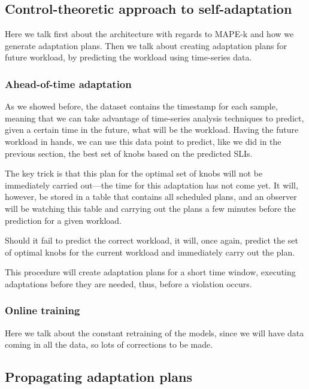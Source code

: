 \subsection{Control-theoretic approach to self-adaptation}

Here we talk first about the architecture with regards to MAPE-k and how we generate adaptation plans. Then we talk about creating adaptation plans for future workload, by predicting the workload using time-series data.

\subsubsection{Ahead-of-time adaptation}

As we showed before, the dataset contains the timestamp for each sample, meaning that we can take advantage of time-series analysis techniques to predict, given a certain time in the future, what will be the workload. Having the future workload in hands, we can use this data point to predict, like we did in the previous section, the best set of knobs based on the predicted SLIs.

The key trick is that this plan for the optimal set of knobs will not be immediately carried out---the time for this adaptation has not come yet. It will, however, be stored in a table that contains all scheduled plans, and an observer will be watching this table and carrying out the plans a few minutes before the prediction for a given workload.

Should it fail to predict the correct workload, it will, once again, predict the set of optimal knobs for the current workload and immediately carry out the plan.

This procedure will create adaptation plans for a short time window, executing adaptations before they are needed, thus, before a violation occurs.


\subsubsection{Online training}

Here we talk about the constant retraining of the models, since we will have data coming in all the data, so lots of corrections to be made.

\subsection{Propagating adaptation plans}

